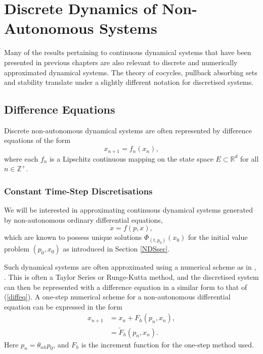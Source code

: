 
\chapter[Discrete Dynamical Systems]{Discrete Dynamics of Non-Autonomous Systems}
  \label{discretechapter}

Many of the results pertaining to continuous dynamical systems that have
been presented in previous chapters are also relevant to discrete and
numerically approximated dynamical systems. The theory of cocycles, pullback
absorbing sets and stability translate under a slightly different notation for
discretised systems.

\section{Difference Equations}\label{diffeqns}

Discrete non-autonomous dynamical systems are often represented by
difference equations of the form
\begin{equation} \label{diffeq}
x_{n+1} = f_n(x_n),
\end{equation}
where each $f_n$ is a Lipschitz continuous mapping on the state
space $E \subset \mathbb{R}^d$ for all $n \in \mathbb{Z}^+$.

\subsection{Constant Time-Step Discretisations}

We will be interested in approximating continuous dynamical
systems generated by non-autonomous ordinary differential equations,
\begin{equation}\label{NDE2}
  \dot{x} = f(p,x),
\end{equation}
which are known to possess unique solutions $\Phi_{(t,p_0)}(x_0)$
for the initial value problem $(p_0, x_0)$ as introduced in Section
\ref{NDSsec}.

Such dynamical systems are often approximated using a numerical scheme as
in \cite{St73}, \cite{St94}. This is often a Taylor Series or Runge-Kutta method,
and the discretised system can then be represented with a difference
equation in a similar form to that of (\ref{diffeq}).  A one-step
numerical scheme for a non-autonomous differential equation can be
expressed in the form
\begin{align}\label{numeq}
   x_{n+1} &= x_{n} + F_h(p_n,x_{n}), \\
   &= \tilde{F}_h(p_n, x_n).
\end{align}
Here $p_n = \theta_{nh}p_0$, and $F_h$ is the increment function for the
one-step method used.

